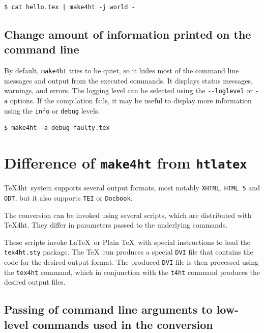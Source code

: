 \begin{verbatim}
$ cat hello.tex | make4ht -j world -
\end{verbatim}

\subsection{Change amount of information printed on the command
line}\label{change-amount-of-information-printed-on-the-command-line}

By default, \texttt{make4ht} tries to be quiet, so it hides most of the
command line messages and output from the executed commands. It displays
status messages, warnings, and errors. The logging level can be selected
using the \texttt{-\/-loglevel} or \texttt{-a} options. If the
compilation fails, it may be useful to display more information using
the \texttt{info} or \texttt{debug} levels.

\begin{verbatim}
$ make4ht -a debug faulty.tex
\end{verbatim}

\section{\texorpdfstring{Difference of \texttt{make4ht} from
\texttt{htlatex}}{Difference of make4ht from htlatex}}\label{difference-of-make4ht-from-htlatex}

\label{sec:htlatex}

\TeX4ht~system supports several output formats, most notably
\texttt{XHTML}, \texttt{HTML\ 5} and \texttt{ODT}, but it also supports
\texttt{TEI} or \texttt{Docbook}.

The conversion can be invoked using several scripts, which are
distributed with \TeX4ht. They differ in parameters passed to the
underlying commands.

These scripts invoke \LaTeX~or Plain \TeX~with special instructions to
load the \texttt{tex4ht.sty} package. The \TeX~run produces a special
\texttt{DVI} file that contains the code for the desired output format.
The produced \texttt{DVI} file is then processed using the
\texttt{tex4ht} command, which in conjunction with the \texttt{t4ht}
command produces the desired output files.

\subsection{Passing of command line arguments to low-level commands used
in the
conversion}\label{passing-of-command-line-arguments-to-low-level-commands-used-in-the-conversion}

